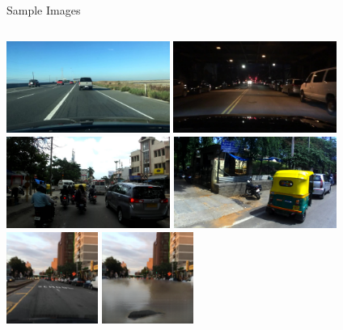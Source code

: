 \documentclass[10pt, aspectratio=169]{beamer}
\begin{document}
\begin{frame}{Sample Images}
    \begin{columns}[t]
        \includegraphics[width=\columnwidth,height=3cm]{images/dataset_images/bdd01.jpg}
        \includegraphics[width=\columnwidth,height=3cm]{images/dataset_images/bdd03.jpg}
        \includegraphics[width=\columnwidth,height=3cm]{images/dataset_images/IDD02.jpg}
        \includegraphics[width=\columnwidth,height=3cm]{images/dataset_images/IDD04.jpg}
        \includegraphics[width=0.5\columnwidth,height=3cm]{images/ClimateGAN/bdd/b1c66a42-6f7d68ca_normal_1024.png}%
        \includegraphics[width=0.5\columnwidth,height=3cm]{images/ClimateGAN/bdd/b1c66a42-6f7d68ca_flood_1024.png}

\end{columns}
\end{frame}
\end{document}
